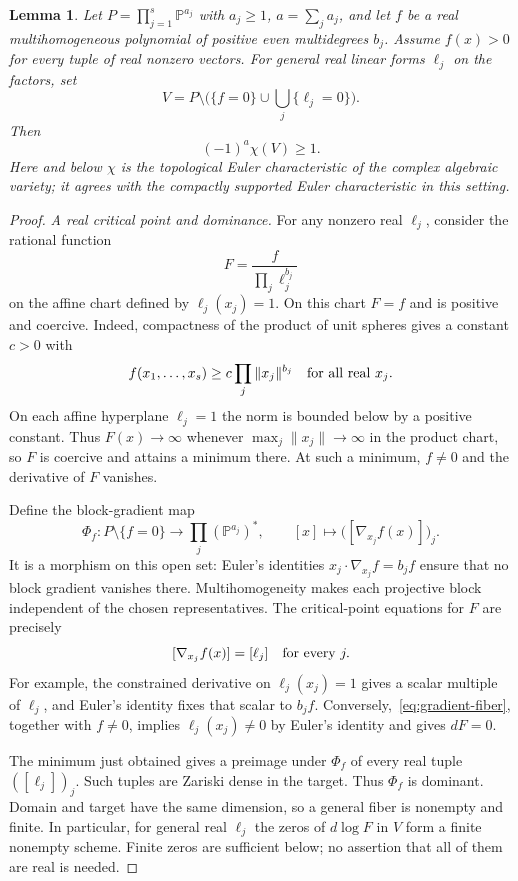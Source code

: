 \documentclass[11pt]{article}
\newtheorem{lemma}[theorem]{Lemma}
\theoremstyle{remark}\newtheorem{remark}[theorem]{Remark}
\newcommand{\PP}{\mathbb P}
\newcommand{\grad}{\nabla}
\begin{document}
\begin{lemma}\label{lem:positive}
Let $P=\prod_{j=1}^s\PP^{a_j}$ with $a_j\geq1$, $a=\sum_ja_j$, and let $f$ be a real multihomogeneous polynomial of positive even multidegrees $b_j$. Assume $f(x)>0$ for every tuple of real nonzero vectors. For general real linear forms $\ell_j$ on the factors, set
\[
 V=P\setminus\bigl(\{f=0\}\cup\bigcup_j\{\ell_j=0\}\bigr).
\]
Then
\[
 (-1)^a\chi(V)\geq1.
\]
Here and below $\chi$ is the topological Euler characteristic of the complex algebraic variety; it agrees with the compactly supported Euler characteristic in this setting.
\end{lemma}
\begin{proof}
\emph{A real critical point and dominance.}
For any nonzero real $\ell_j$, consider the rational function
\[
 F=\frac{f}{\prod_j\ell_j^{b_j}}
\]
on the affine chart defined by $\ell_j(x_j)=1$. On this chart $F=f$ and is positive and coercive. Indeed, compactness of the product of unit spheres gives a constant $c>0$ with
\[
 f(x_1,\ldots,x_s)\geq c\prod_j\|x_j\|^{b_j}
 \quad\hbox{for all real }x_j.
\]
On each affine hyperplane $\ell_j=1$ the norm is bounded below by a positive constant. Thus $F(x)\to\infty$ whenever $\max_j\|x_j\|\to\infty$ in the product chart, so $F$ is coercive and attains a minimum there. At such a minimum, $f\neq0$ and the derivative of $F$ vanishes.

Define the block-gradient map
\[
 \Phi_f:P\setminus\{f=0\}\longrightarrow\prod_j(\PP^{a_j})^*,
 \qquad [x]\longmapsto\bigl([\grad_{x_j}f(x)]\bigr)_j.
\]
It is a morphism on this open set: Euler's identities
$x_j\cdot\grad_{x_j}f=b_jf$ ensure that no block gradient vanishes there. Multihomogeneity makes each projective block independent of the chosen representatives. The critical-point equations for $F$ are precisely
\begin{equation}\label{eq:gradient-fiber}
 [\grad_{x_j}f(x)]=[\ell_j]\quad\hbox{for every }j.
\end{equation}
For example, the constrained derivative on $\ell_j(x_j)=1$ gives a scalar multiple of $\ell_j$, and Euler's identity fixes that scalar to $b_jf$. Conversely,~\eqref{eq:gradient-fiber}, together with $f\neq0$, implies $\ell_j(x_j)\neq0$ by Euler's identity and gives $dF=0$.

The minimum just obtained gives a preimage under $\Phi_f$ of every real tuple $([\ell_j])_j$. Such tuples are Zariski dense in the target. Thus $\Phi_f$ is dominant. Domain and target have the same dimension, so a general fiber is nonempty and finite. In particular, for general real $\ell_j$ the zeros of $d\log F$ in $V$ form a finite nonempty scheme. Finite zeros are sufficient below; no assertion that all of them are real is needed.


\end{proof}
\end{document}
